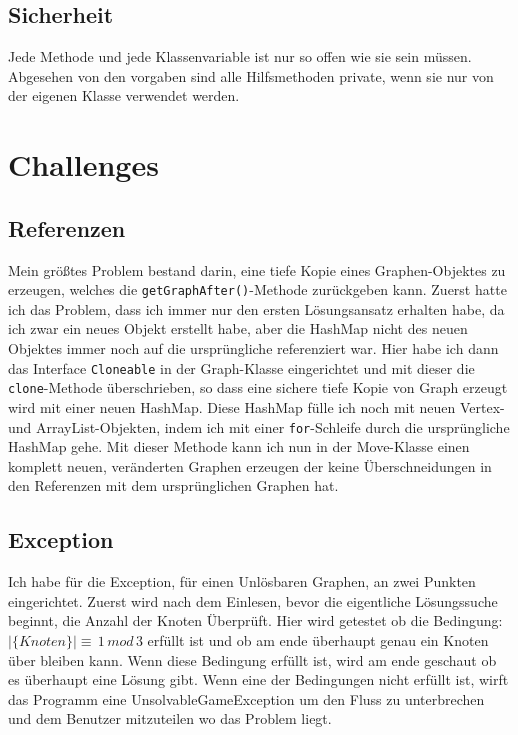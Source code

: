 \documentclass[12pt,a4paper]{article}
\begin{document}
\subsection*{Sicherheit}
Jede Methode und jede Klassenvariable ist nur so offen wie sie sein müssen. Abgesehen von den vorgaben sind alle Hilfsmethoden private, wenn sie nur von der eigenen Klasse verwendet werden.

\section{Challenges}
\subsection{Referenzen}
Mein größtes Problem bestand darin, eine tiefe Kopie eines Graphen-Objektes zu erzeugen, welches die \texttt{getGraphAfter()}-Methode zurückgeben kann. Zuerst hatte ich das Problem, dass ich immer nur den ersten Lösungsansatz erhalten habe, da ich zwar ein neues Objekt erstellt habe, aber die HashMap nicht des neuen Objektes immer noch auf die ursprüngliche referenziert war. Hier habe ich dann das Interface \texttt{Cloneable} in der Graph-Klasse eingerichtet und mit dieser die \texttt{clone}-Methode überschrieben, so dass eine sichere tiefe Kopie von Graph erzeugt wird mit einer neuen HashMap. Diese HashMap fülle ich noch mit neuen Vertex- und ArrayList-Objekten, indem ich mit einer \texttt{for}-Schleife durch die ursprüngliche HashMap gehe. Mit dieser Methode kann ich nun in der Move-Klasse einen komplett neuen, veränderten Graphen erzeugen der keine Überschneidungen in den Referenzen mit dem ursprünglichen Graphen hat.

\subsection{Exception}
Ich habe für die Exception, für einen Unlösbaren Graphen, an zwei Punkten eingerichtet. Zuerst wird nach dem Einlesen, bevor die eigentliche Lösungssuche beginnt, die Anzahl der Knoten Überprüft. Hier wird getestet ob die Bedingung: $|\{Knoten\}| \equiv \,1\, mod\, 3$ erfüllt ist und ob am ende überhaupt genau ein Knoten über bleiben kann. Wenn diese Bedingung erfüllt ist, wird am ende geschaut ob es überhaupt eine Lösung gibt. Wenn eine der Bedingungen nicht erfüllt ist, wirft das Programm eine UnsolvableGameException um den Fluss zu unterbrechen und dem Benutzer mitzuteilen wo das Problem liegt.
\end{document}
